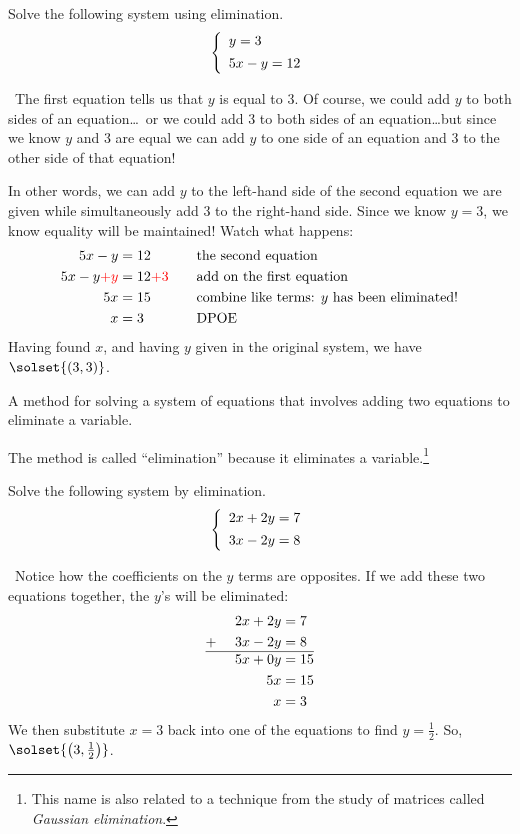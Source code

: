 \begin{boxedex}
Solve the following system using elimination. \[\twosystem{y=3}{5x-y=12}\]

\exsoln\ The first equation tells us that $y$ is equal to 3. Of course, we could add $y$ to both sides of an equation\ldots\ or we could add 3 to both sides of an equation\ldots but since we know $y$ and 3 are equal we can add $y$ to one side of an equation and 3 to the other side of that equation!

In other words, we can add $y$ to the left-hand side of the second equation we are given while simultaneously add $3$ to the right-hand side. Since we know $y=3$, we know equality will be maintained! Watch what happens:
\[
\begin{aligned}
5x-y &= 12
&&\quad\text{the second equation}\\
5x-y {\color{red}+y} &=12{\color{red}+3}
&&\quad\text{add on the first equation}\\
5x &=15
&&\quad\text{combine like terms: $y$ has been eliminated!}\\
x &=3
&&\quad\text{DPOE}
\end{aligned}
\]
Having found $x$, and having $y$ given in the original system, we have $\solset{(3,3)}$.
\end{boxedex}

\begin{boxeddef}
A method for solving a system of equations that involves adding two equations to eliminate a variable.
\end{boxeddef}

The method is called ``elimination'' because it eliminates a variable.\footnote{This name is also related to a technique from the study of matrices called \textit{Gaussian elimination}.}

\begin{boxedex}
Solve the following system by elimination. \[\twosystem{2x + 2y = 7}{3x - 2y = 8}\]

\exsoln\ Notice how the coefficients on the $y$ terms are opposites. If we add these two equations together, the $y$'s will be eliminated:
\[
\begin{aligned}
		&&2x + 2y	&= 7\\
+~		&&3x - 2y	&= 8\\\hline
		&&5x +0y	&= 15\\
		&&5x 		&= 15\\
		&&x 		&= 3
\end{aligned}
\]
We then substitute $x=3$ back into one of the equations to find $y = \frac{1}{2}$. So, $\solset{\left(3,\frac{1}{2}\right)}$.
\end{boxedex}

